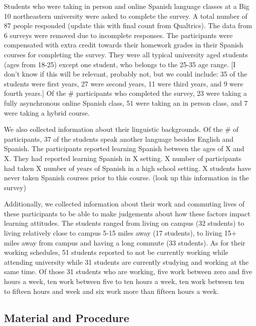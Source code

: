 \documentclass[
  man]{apa6}
\begin{document}
Students who were taking in person and online Spanish language classes at a Big 10 northeastern university were asked to complete the survey.
A total number of 87 people responded (update this with final count from Qualtrics).
The data from 6 surveys were removed due to incomplete responses.
The participants were compensated with extra credit towards their homework grades in their Spanish courses for completing the survey.
They were all typical university aged students (ages from 18-25) except one student, who belongs to the 25-35 age range.
{[}I don't know if this will be relevant, probably not, but we could include: 35 of the students were first years, 27 were second years, 11 were third years, and 9 were fourth years.{]}
Of the \# participants who completed the survey, 23 were taking a fully asynchronous online Spanish class, 51 were taking an in person class, and 7 were taking a hybrid course.

We also collected information about their linguistic backgrounds.
Of the \# of participants, 37 of the students speak another language besides English and Spanish.
The participants reported learning Spanish between the ages of X and X.
They had reported learning Spanish in X setting.
X number of participants had taken X number of years of Spanish in a high school setting.
X students have never taken Spanish courses prior to this course. (look up this information in the survey)

Additionally, we collected information about their work and commuting lives of these participants to be able to make judgements about how these factors impact learning attitudes.
The students ranged from living on campus (32 students) to living relatively close to campus 5-15 miles away (17 students), to living 15+ miles away from campus and having a long commute (33 students).
As for their working schedules, 51 students reported to not be currently working while attending university while 31 students are currently studying and working at the same time.
Of those 31 students who are working, five work between zero and five hours a week, ten work between five to ten hours a week, ten work between ten to fifteen hours and week and six work more than fifteen hours a week.

\hypertarget{material-and-procedure}{%
\subsection{Material and Procedure}\label{material-and-procedure}}
\end{document}
